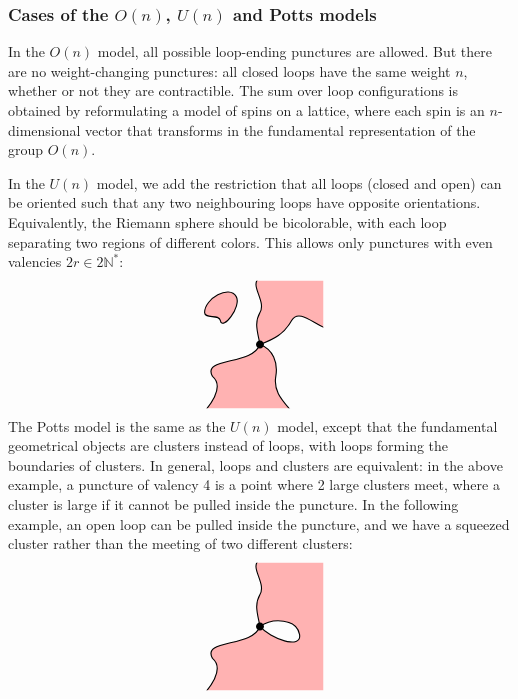 \documentclass[12pt, a4paper]{article}
\theoremstyle{break}
\begin{document}
\subsubsection{Cases of the $O(n)$, $U(n)$ and Potts models}\label{sec:coup}

In the $O(n)$ model, all possible loop-ending punctures are allowed. But there are no weight-changing punctures: all closed loops have the same weight $n$, whether or not they are contractible. The sum over loop configurations is obtained by reformulating a model of spins on a lattice, where each spin is an $n$-dimensional vector that transforms in the fundamental representation of the group $O(n)$. 

In the $U(n)$ model, we add the restriction that all loops (closed and open) can be oriented such that any two neighbouring loops have opposite orientations. Equivalently, the Riemann sphere should be bicolorable, with each loop separating two regions of different colors. This allows only punctures with even valencies $2r\in 2\mathbb{N}^*$:
\begin{align}
 \begin{tikzpicture}[baseline=(current  bounding  box.center), scale = .4]
 \clip (-4, -4) rectangle (4, 4);
  \filldraw[thick, fill = red!30] (0, 0) to [out = 100, in = -120] (0, 2) to [out = 60, in = -150] (0, 4.2) -- (4.2, 4.2) -- (4.2, 1) to [out = 160, in = 60] (2, 1.5) to [out = -120, in = 20] (0, 0);
  \filldraw[thick, fill = red!30] (0, 0) to [out = -20, in = 80] (1, -2) to [out = -100, in = 130] (2, -4.2) -- (-3.5, -4.2) to [out = 50, in = -40] (-3, -2) to [out = 120, in = -110] (0, 0);
  \filldraw[thick, fill = red!30] (-3.5, 2) to [out = 90, in = 120] (-1.5, 3) to [out = -60, in = -80] (-2.5, 1.5) to [out = 100, in = -90] (-3.5, 2);
   \draw (0, 0) node[fill, circle, minimum size = 2mm, inner sep = 0]{};
 \end{tikzpicture}
\end{align}
The Potts model is the same as the $U(n)$ model, except that the fundamental geometrical objects are clusters instead of loops, with loops forming the boundaries of clusters. In general, loops and clusters are equivalent: in the above example, a puncture of valency 4 is a point where 2 large clusters meet, where a cluster is large if it cannot be pulled inside the puncture. In the following example, an open loop can be pulled inside the puncture, and we have a squeezed cluster rather than the meeting of two different clusters:
\begin{align}
 \begin{tikzpicture}[baseline=(current  bounding  box.center), scale = .4]
  \clip (-4, -4) rectangle (4, 4);
  \filldraw[thick, fill = red!30] (0, 0) to [out = 100, in = -120] (0, 2) to [out = 60, in = -150] (0, 4.2) -- (4.2, 4.2) -- (4.2, -4.2) -- (-3.5, -4.2) to [out = 50, in = -40] (-3, -2) to [out = 120, in = -110] (0, 0) to [out = -50, in = -80] (2.5, -.5) to [out = 100, in = 35] (0, 0);
   \draw (0, 0) node[fill, circle, minimum size = 2mm, inner sep = 0]{};
 \end{tikzpicture}
\end{align}
\end{document}
